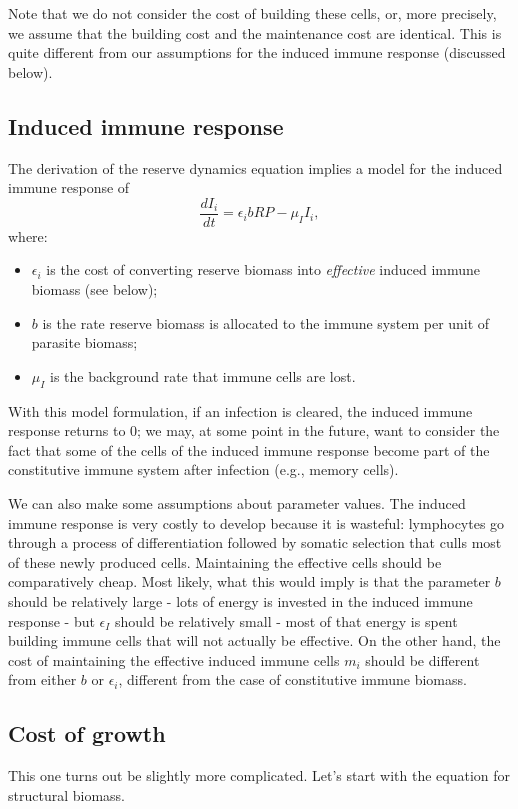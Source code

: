 \documentclass[11pt,reqno,final,pdftex]{amsart}\usepackage[]{graphicx}\usepackage[]{color}
\theoremstyle{plain}
\numberwithin{equation}{part}
\begin{document}
Note that we do not consider the cost of building these cells, or, more precisely, we assume that the building cost and the maintenance cost are identical. This is quite different from our assumptions for the induced immune response (discussed below).

\subsection*{ Induced immune response}
The derivation of the reserve dynamics equation implies a model for the induced immune response of
\begin{equation}
\frac{dI_i}{dt}=\epsilon _ib R P-\mu _II_i,
\end{equation}
where:
\begin{itemize}
\item $\epsilon _i$ is the cost of converting reserve biomass into \textit{ effective }induced immune biomass (see below);
\item $b$ is the rate reserve biomass is allocated to the immune system per unit of parasite biomass;
\item $\mu _I$ is the background rate that immune cells are lost.
\end{itemize}

With this model formulation, if an infection is cleared, the induced immune response returns to 0; we may, at some point in the future, want to consider the fact that some of the cells of the induced immune response become part of the constitutive immune system after infection (e.g., memory cells).

We can also make some assumptions about parameter values.
The induced immune response is very costly to develop because it is wasteful: lymphocytes go through a process of differentiation followed by somatic selection that culls most of these newly produced cells.
Maintaining the effective cells should be comparatively cheap.
Most likely, what this would imply is that the parameter $b$ should be relatively large - lots of energy is invested in the induced immune response - but $\epsilon _I$ should be relatively small - most of that energy is spent building immune cells that will not actually be effective.
On the other hand, the cost of maintaining the effective induced immune cells $m_i$ should be different from either $b$ or $\epsilon_i$, different from the case of constitutive immune biomass.

\subsection*{Cost of growth}
This one turns out be slightly more complicated.
Let's start with the equation for structural biomass.
\end{document}
